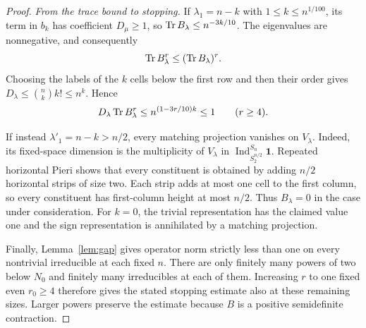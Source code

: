 \begin{proof}
\medskip\noindent
\emph{From the trace bound to stopping.}
If $\lambda_1=n-k$ with $1\le k\le n^{1/100}$, its term in $b_k$
has coefficient $D_\mu\ge1$, so
$\operatorname{Tr} B_\lambda\le n^{-3k/10}$. The eigenvalues are
nonnegative, and consequently
\[
 \operatorname{Tr} B_\lambda^r
 \le(\operatorname{Tr} B_\lambda)^r.
\]
Choosing the labels of the $k$ cells below the first row and then
their order gives $D_\lambda\le\binom nk k!\le n^k$. Hence
\[
 D_\lambda\operatorname{Tr} B_\lambda^r
 \le n^{(1-3r/10)k}\le1\qquad(r\ge4).
\]

If instead $\lambda'_1=n-k>n/2$, every matching projection vanishes
on $V_\lambda$. Indeed, its fixed-space dimension is the
multiplicity of $V_\lambda$ in
$\operatorname{Ind}_{S_2^{n/2}}^{S_n}\mathbf1$. Repeated horizontal
Pieri shows that every constituent is obtained by adding $n/2$
horizontal strips of size two. Each strip adds at most one cell to
the first column, so every constituent has first-column height at
most $n/2$. Thus $B_\lambda=0$ in the case under consideration.
For $k=0$, the trivial representation has the claimed value one
and the sign representation is annihilated by a matching projection.

Finally, Lemma~\ref{lem:gap} gives operator norm strictly less than
one on every nontrivial irreducible at each fixed $n$.
There are only finitely many powers of two below $N_0$ and finitely
many irreducibles at each of them. Increasing $r$ to one fixed even
$r_0\ge4$ therefore gives the stated stopping estimate also at these
remaining sizes. Larger powers preserve the estimate because $B$
is a positive semidefinite contraction.
\end{proof}
